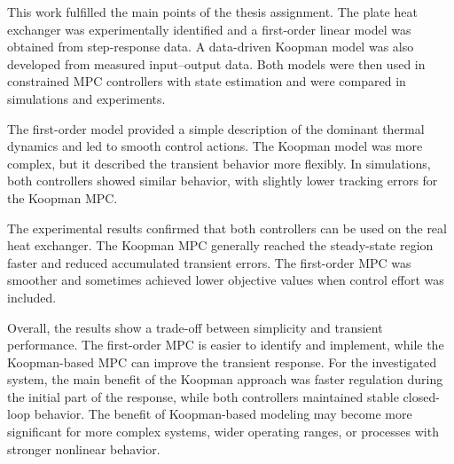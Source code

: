 This work fulfilled the main points of the thesis assignment. The plate heat exchanger was experimentally identified and a first-order linear model was obtained from step-response data. A data-driven Koopman model was also developed from measured input--output data. Both models were then used in constrained MPC controllers with state estimation and were compared in simulations and experiments.

The first-order model provided a simple description of the dominant thermal dynamics and led to smooth control actions. The Koopman model was more complex, but it described the transient behavior more flexibly. In simulations, both controllers showed similar behavior, with slightly lower tracking errors for the Koopman MPC.

The experimental results confirmed that both controllers can be used on the real heat exchanger. The Koopman MPC generally reached the steady-state region faster and reduced accumulated transient errors. The first-order MPC was smoother and sometimes achieved lower objective values when control effort was included.


Overall, the results show a trade-off between simplicity and transient performance. The first-order MPC is easier to identify and implement, while the Koopman-based MPC can improve the transient response. For the investigated system, the main benefit of the Koopman approach was faster regulation during the initial part of the response, while both controllers maintained stable closed-loop behavior. The benefit of Koopman-based modeling may become more significant for more complex systems, wider operating ranges, or processes with stronger nonlinear behavior.